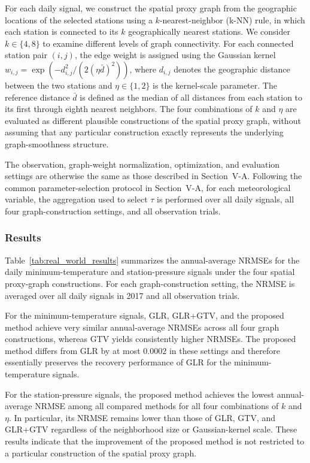 For each daily signal, we construct the spatial proxy graph from the geographic locations of the selected stations using a $k$-nearest-neighbor (k-NN) rule, in which each station is connected to its $k$ geographically nearest stations.
We consider $k\in\{4,8\}$ to examine different levels of graph connectivity.
For each connected station pair $(i,j)$, the edge weight is assigned using the Gaussian kernel
$w_{i,j}=\exp(-d_{i,j}^{2}/(2(\eta\bar d)^{2}))$,
where $d_{i,j}$ denotes the geographic distance between the two stations and $\eta\in\{1,2\}$ is the kernel-scale parameter.
The reference distance $\bar d$ is defined as the median of all distances from each station to its first through eighth nearest neighbors.
The four combinations of $k$ and $\eta$ are evaluated as different plausible constructions of the spatial proxy graph, without assuming that any particular construction exactly represents the underlying graph-smoothness structure.

The observation, graph-weight normalization, optimization, and evaluation settings are otherwise the same as those described in Section~V-A.
Following the common parameter-selection protocol in Section~V-A, for each meteorological variable, the aggregation used to select $\tau$ is performed over all daily signals, all four graph-construction settings, and all observation trials.

\subsubsection{Results}

Table~\ref{tab:real_world_results} summarizes the annual-average NRMSEs for the daily minimum-temperature and station-pressure signals under the four spatial proxy-graph constructions.
For each graph-construction setting, the NRMSE is averaged over all daily signals in 2017 and all observation trials.

For the minimum-temperature signals, GLR, GLR+GTV, and the proposed method achieve very similar annual-average NRMSEs across all four graph constructions, whereas GTV yields consistently higher NRMSEs.
The proposed method differs from GLR by at most $0.0002$ in these settings and therefore essentially preserves the recovery performance of GLR for the minimum-temperature signals.

For the station-pressure signals, the proposed method achieves the lowest annual-average NRMSE among all compared methods for all four combinations of $k$ and $\eta$.
In particular, its NRMSE remains lower than those of GLR, GTV, and GLR+GTV regardless of the neighborhood size or Gaussian-kernel scale.
These results indicate that the improvement of the proposed method is not restricted to a particular construction of the spatial proxy graph.

